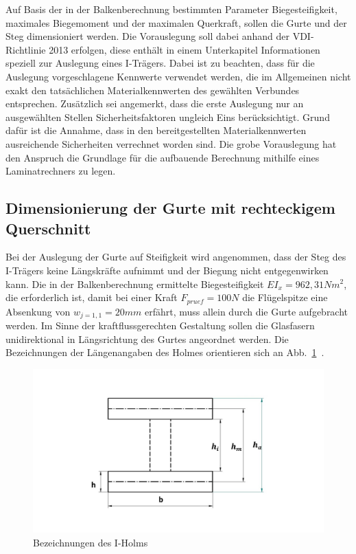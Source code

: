 
Auf Basis der in der Balkenberechnung bestimmten Parameter Biegesteifigkeit, maximales Biegemoment und der maximalen Querkraft, sollen die Gurte und der Steg dimensioniert werden. Die Vorauslegung soll dabei anhand der VDI-Richtlinie 2013 erfolgen, diese enthält in einem Unterkapitel Informationen speziell zur Auslegung eines I-Trägers. Dabei ist zu beachten, dass für die Auslegung vorgeschlagene Kennwerte verwendet werden, die im Allgemeinen nicht exakt den tatsächlichen Materialkennwerten des gewählten Verbundes entsprechen. Zusätzlich sei angemerkt, dass die erste Auslegung nur an ausgewählten Stellen Sicherheitsfaktoren ungleich Eins berücksichtigt. Grund dafür ist die Annahme, dass in den bereitgestellten Materialkennwerten ausreichende Sicherheiten verrechnet worden sind. Die grobe Vorauslegung hat den Anspruch die Grundlage für die aufbauende Berechnung mithilfe eines Laminatrechners zu legen.

\subsection{Dimensionierung der Gurte mit rechteckigem Querschnitt}
\label{GurtDim}
Bei der Auslegung der Gurte auf Steifigkeit wird angenommen, dass der Steg des I-Trägers keine Längskräfte aufnimmt und der Biegung nicht entgegenwirken kann. Die in der Balkenberechnung ermittelte Biegesteifigkeit $ EI_{x} = 962,31 Nm^{2} $, die erforderlich ist, damit bei einer Kraft $ F_{pruef}=100N $ die Flügelspitze eine Absenkung von $ w_{j=1,1}=20mm $ erfährt, muss allein durch die Gurte aufgebracht werden. Im Sinne der kraftflussgerechten Gestaltung sollen die Glasfasern unidirektional in Längsrichtung des Gurtes angeordnet werden. Die Bezeichnungen der Längenangaben des Holmes orientieren sich an Abb.~\ref{fig: Rechteckholm}~.\\

\begin{figure}[h]
	\includegraphics[width=1.0\textwidth]{Bilder/RechteckHolm.jpg}
	\caption{Bezeichnungen des I-Holms}
	\label{fig: Rechteckholm}
\end{figure}

